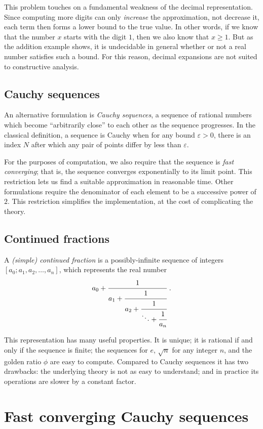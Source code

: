 \documentclass[leqno]{report}
\begin{document}
This problem touches on a fundamental weakness of the decimal representation. Since computing more digits can only \emph{increase} the approximation, not decrease it, each term then forms a lower bound to the true value. In other words, if we know that the number $x$ starts with the digit $1$, then we also know that $x \geq 1$. But as the addition example shows, it is undecidable in general whether or not a real number satisfies such a bound. For this reason, decimal expansions are not suited to constructive analysis.

\section{Cauchy sequences}

An alternative formulation is \textit{Cauchy sequences}, a sequence of rational numbers which become ``arbitrarily close'' to each other as the sequence progresses. In the classical definition, a sequence is Cauchy when for any bound $\varepsilon > 0$, there is an index $N$ after which any pair of points differ by less than $\varepsilon$.

For the purposes of computation, we also require that the sequence is \textit{fast converging}; that is, the sequence converges exponentially to its limit point. This restriction lets us find a suitable approximation in reasonable time. Other formulations require the denominator of each element to be a successive power of $2$. This restriction simplifies the implementation, at the cost of complicating the theory.

\section{Continued fractions}

A \textit{(simple) continued fraction} is a possibly-infinite sequence of integers $[a_0; a_1, a_2, \ldots, a_n]$, which represents the real number
\[
    a_0 + \cfrac{1}{a_1 + \cfrac{1}{a_2 + \cfrac{1}{\ddots + \cfrac{1}{a_n}}}}
    \ .
\]

This representation has many useful properties. It is unique; it is rational if and only if the sequence is finite; the sequences for $e$, $\sqrt{n}$ for any integer $n$, and the golden ratio $\phi$ are easy to compute. Compared to Cauchy sequences it has two drawbacks: the underlying theory is not as easy to understand; and in practice its operations are slower by a constant factor.

\chapter{Fast converging Cauchy sequences}
\end{document}

